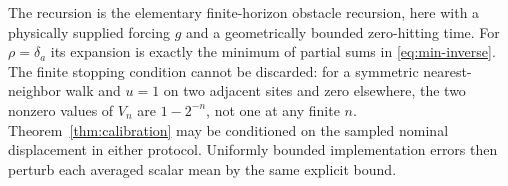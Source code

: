 The recursion is the elementary finite-horizon obstacle recursion, here
with a physically supplied forcing $g$ and a geometrically bounded
zero-hitting time. For $\rho=\delta_a$ its expansion is exactly the
minimum of partial sums in \eqref{eq:min-inverse}. The finite stopping
condition cannot be discarded: for a symmetric nearest-neighbor walk
and $u=1$ on two adjacent sites and zero elsewhere, the two nonzero
values of $V_n$ are $1-2^{-n}$, not one at any finite $n$.
Theorem~\ref{thm:calibration} may be conditioned on the sampled nominal
displacement in either protocol. Uniformly bounded implementation errors
then perturb each averaged scalar mean by the same explicit bound.
